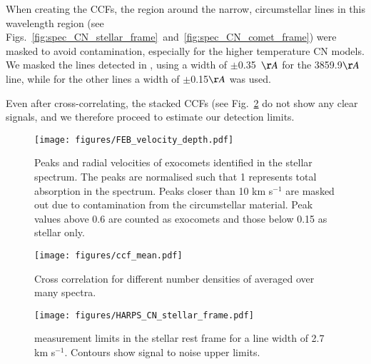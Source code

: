 \documentclass{aa}
\newcommand{\kms}{km s$^{-1}$}
\begin{document}
When creating the CCFs, the region around the narrow, circumstellar  lines in this wavelength region (see Figs.~\ref{fig:spec_CN_stellar_frame}~and~\ref{fig:spec_CN_comet_frame}) were masked to avoid contamination, especially for the higher temperature CN models.
%
We masked the lines detected in \citep{Kiefer2018}, using a width of $\pm$0.35~$\AA$ for the  3859.9$\AA$ line, while for the other lines a width of $\pm$0.15$\AA$ was used.

Even after cross-correlating, the stacked CCFs (see Fig.~\ref{fig:ccf_mean} do not show any clear signals, and we therefore proceed to estimate our detection limits.

\begin{figure}
    \begin{centering}
        \texttt{[image: figures/FEB\_velocity\_depth.pdf]}
        \caption{Peaks and radial velocities of exocomets identified in the stellar spectrum.
        The peaks are normalised such that 1 represents total absorption in the spectrum.
        Peaks closer than 10 \kms{} are masked out due to contamination from the circumstellar material.
        Peak values above 0.6 are counted as exocomets and those below 0.15 as stellar only.}
        \label{fig:FEB_velocity}
    \end{centering}
\end{figure}

\begin{figure}
    \begin{centering}
        \texttt{[image: figures/ccf\_mean.pdf]}
        \caption{Cross correlation for different number densities of  averaged over many spectra.}
        \label{fig:ccf_mean}
    \end{centering}
\end{figure}

\begin{figure}
    \begin{centering}
        \texttt{[image: figures/HARPS\_CN\_stellar\_frame.pdf]}
        \caption{ measurement limits in the stellar rest frame for a  line width of 2.7 \kms{}. Contours show signal to noise upper limits.}
        \label{fig:CN_stellar_frame}
    \end{centering}
\end{figure}
\end{document}
